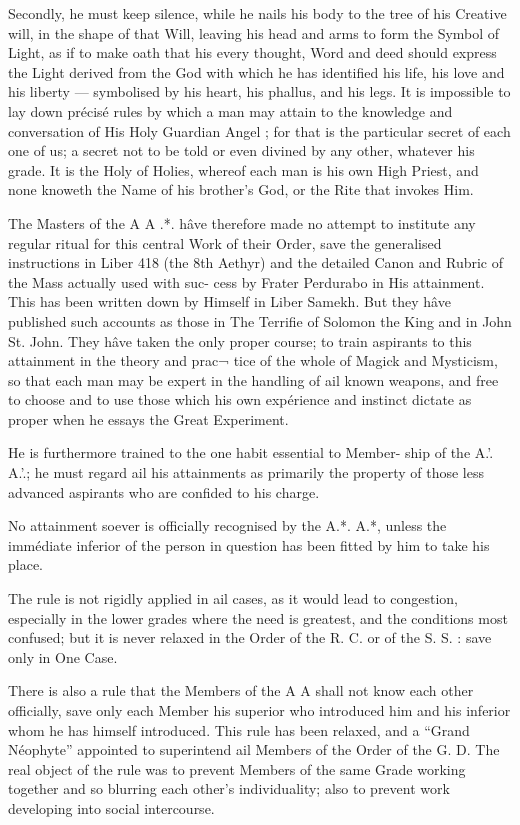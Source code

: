 Secondly, he must keep silence, while he nails his body to the tree of his Creative will, in the shape of that Will, leaving his head and arms to form the Symbol of Light, as if to make oath that his every thought, Word and deed should express the Light derived from the God with which he has identified his life, his love and his liberty — symbolised by his heart, his phallus, and his legs. It is impossible to lay down précisé rules by which a man may attain to the knowledge and conversation of His Holy Guardian Angel ; for that is the particular secret of each one of us; a secret not to be told or even divined by any other, whatever his grade. It is the Holy of Holies, whereof each man is his own High Priest, and none knoweth the Name of his brother’s God, or the Rite that invokes Him.

The Masters of the A A .*. hâve therefore made no attempt to institute any regular ritual for this central Work of their Order, save the generalised instructions in Liber 418 (the 8th Aethyr) and the detailed Canon and Rubric of the Mass actually used with suc- cess by Frater Perdurabo in His attainment. This has been written down by Himself in Liber Samekh. But they hâve published such accounts as those in The Terrifie of Solomon the King and in John St. John. They hâve taken the only proper course; to train aspirants to this attainment in the theory and prac¬ tice of the whole of Magick and Mysticism, so that each man may be expert in the handling of ail known weapons, and free to choose and to use those which his own expérience and instinct dictate as proper when he essays the Great Experiment.

He is furthermore trained to the one habit essential to Member- ship of the A.'. A.'.; he must regard ail his attainments as primarily the property of those less advanced aspirants who are confided to his charge.

No attainment soever is officially recognised by the A.*. A.*, unless the immédiate inferior of the person in question has been fitted by him to take his place.

The rule is not rigidly applied in ail cases, as it would lead to congestion, especially in the lower grades where the need is greatest, and the conditions most confused; but it is never relaxed in the Order of the R. C. or of the S. S. : save only in One Case.

There is also a rule that the Members of the A A shall not know each other officially, save only each Member his superior who introduced him and his inferior whom he has himself introduced. This rule has been relaxed, and a “Grand Néophyte” appointed to superintend ail Members of the Order of the G. D. The real object of the rule was to prevent Members of the same Grade working together and so blurring each other’s individuality; also to prevent work developing into social intercourse.

